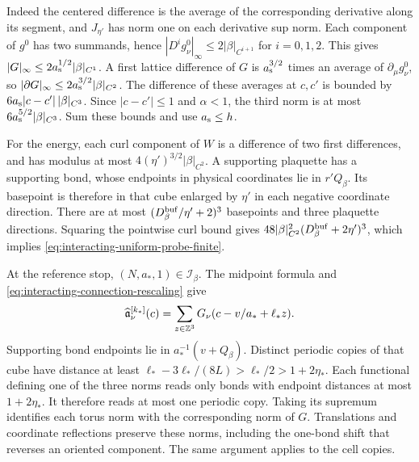 Indeed the centered difference is the average
of the corresponding derivative along its
segment, and $J_{\eta'}$ has norm one on
each derivative sup norm. Each component
of $g^0$ has two summands, hence
$|D^ig_\nu^0|_\infty\le2|\beta|_{C^{i+1}}$ for
$i=0,1,2$. This gives
$|G|_\infty\le2a_{\rm s}^{1/2}|\beta|_{C^1}$.
A first lattice difference of $G$ is
$a_{\rm s}^{3/2}$ times an average of
$\partial_\mu g_\nu^0$, so
$|\partial G|_\infty\le2a_{\rm s}^{3/2}|\beta|_{C^2}$.
The difference of these averages at $c,c'$
is bounded by
$6a_{\rm s}|c-c'|\,|\beta|_{C^3}$.
Since $|c-c'|\le1$ and $\alpha<1$,
the third norm is at most
$6a_{\rm s}^{5/2}|\beta|_{C^3}$.
Sum these bounds and use $a_{\rm s}\le h$.

For the energy, each curl component of $W$
is a difference of two first differences,
and has modulus at most
$4(\eta')^{3/2}|\beta|_{C^2}$.
A supporting plaquette has a supporting
bond, whose endpoints in physical coordinates
lie in $r'Q_\beta$.
Its basepoint is therefore in that cube
enlarged by $\eta'$ in each negative
coordinate direction. There are at most
$(D_\beta^{\rm buf}/\eta'+2)^3$ basepoints
and three plaquette directions. Squaring
the pointwise curl bound gives
$48|\beta|_{C^2}^2(D_\beta^{\rm buf}+2\eta')^3$,
which implies \eqref{eq:interacting-uniform-probe-finite}.

At the reference stop, $(N,a_*,1)\in\mathcal I_\beta$.
The midpoint formula and
\eqref{eq:interacting-connection-rescaling} give
\[
 \widehat{\mathfrak a}^{[k_*]}_\nu(c)
       =\sum_{z\in\mathbb Z^3}G_\nu(c-v/a_*+\ell_*z).
\]
Supporting bond endpoints lie in
$a_*^{-1}(v+Q_\beta)$.
Distinct periodic copies of that cube have
distance at least
$\ell_*-3\ell_*/(8L)>\ell_*/2>1+2\eta_*$.
Each functional defining one of the three
norms reads only bonds with endpoint distances
at most $1+2\eta_*$. It therefore reads
at most one periodic copy. Taking its
supremum identifies each torus norm with
the corresponding norm of $G$.
Translations and coordinate reflections
preserve these norms, including the one-bond
shift that reverses an oriented component.
The same argument applies to the cell copies.

